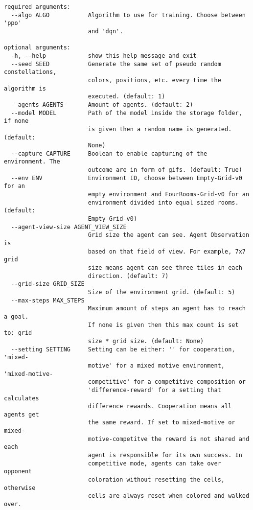 \small{
    \begin{verbatim}
required arguments:
  --algo ALGO           Algorithm to use for training. Choose between 'ppo'
                        and 'dqn'.

optional arguments:
  -h, --help            show this help message and exit
  --seed SEED           Generate the same set of pseudo random constellations,
                        colors, positions, etc. every time the algorithm is
                        executed. (default: 1)
  --agents AGENTS       Amount of agents. (default: 2)
  --model MODEL         Path of the model inside the storage folder, if none
                        is given then a random name is generated. (default:
                        None)
  --capture CAPTURE     Boolean to enable capturing of the environment. The
                        outcome are in form of gifs. (default: True)
  --env ENV             Environment ID, choose between Empty-Grid-v0 for an
                        empty environment and FourRooms-Grid-v0 for an
                        environment divided into equal sized rooms. (default:
                        Empty-Grid-v0)
  --agent-view-size AGENT_VIEW_SIZE
                        Grid size the agent can see. Agent Observation is
                        based on that field of view. For example, 7x7 grid
                        size means agent can see three tiles in each
                        direction. (default: 7)
  --grid-size GRID_SIZE
                        Size of the environment grid. (default: 5)
  --max-steps MAX_STEPS
                        Maximum amount of steps an agent has to reach a goal.
                        If none is given then this max count is set to: grid
                        size * grid size. (default: None)
  --setting SETTING     Setting can be either: '' for cooperation, 'mixed-
                        motive' for a mixed motive environment, 'mixed-motive-
                        competitive' for a competitive composition or
                        'difference-reward' for a setting that calculates
                        difference rewards. Cooperation means all agents get
                        the same reward. If set to mixed-motive or mixed-
                        motive-competitve the reward is not shared and each
                        agent is responsible for its own success. In
                        competitive mode, agents can take over opponent
                        coloration without resetting the cells, otherwise
                        cells are always reset when colored and walked over.

\end{verbatim}}
